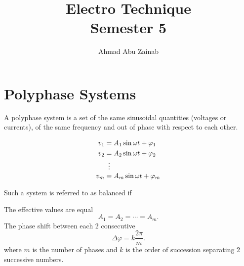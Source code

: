 \documentclass{report}
\title{\Huge{Electro Technique}\\Semester 5}
\author{\huge{Ahmad Abu Zainab}}
\date{}
\begin{document}
\maketitle
\newpage%
\tableofcontents
\pagebreak


\chapter{Polyphase Systems}

A polyphase system is a set of the same sinusoidal quantities (voltages or currents), of the same frequency and out of phase with respect to each other.

\begin{align*}
	v_1                & = A_1\sin \omega t + \varphi_1                   \\
	v_2                & = A_2\sin \omega t + \varphi_2                   \\
	\MTFlushSpaceBelow & \shortvdotswithin{=}          \MTFlushSpaceAbove \\
	v_m                & = A_m\sin \omega t + \varphi_m
\end{align*}

Such a system is referred to as balanced if

\begin{enumerate}
	\ii The effective values are equal
	\[
		A_1 = A_2 = \cdots = A_m
		.\]
	\ii The phase shift between each 2 consecutive
	\[
		\Delta \varphi = k \frac{2\pi }{m}
		.\]
	where $ m $ is the number of phases and $ k  $ is the order of succession separating 2 successive numbers.

\end{enumerate}
\end{document}
